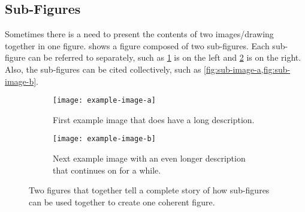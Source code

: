 \subsection{Sub-Figures}
    Sometimes there is a need to present the contents of two images/drawing together in one figure.
     shows a figure composed of two sub-figures.
    Each sub-figure can be referred to separately, such as \cref{fig:sub-image-a} is on the left and \cref{fig:sub-image-b} is on the right.
    Also, the sub-figures can be cited collectively, such as \cref{fig:sub-image-a,fig:sub-image-b}.
    \begin{figure}
        \centering
        \begin{subfigure}[t]{2in}
            \texttt{[image: example-image-a]}
            \caption{First example image that does have a long description.}
            \label{fig:sub-image-a}
        \end{subfigure}
        \hspace{0.1in}
        \begin{subfigure}[t]{2in}
            \texttt{[image: example-image-b]}
            \caption{Next example image with an even longer description that continues on for a while.}
            \label{fig:sub-image-b}
        \end{subfigure}
        \caption{Two figures that together tell a complete story of how sub-figures can be used together to create one coherent figure.}
        \label{fig:subfig-example}
    \end{figure}

